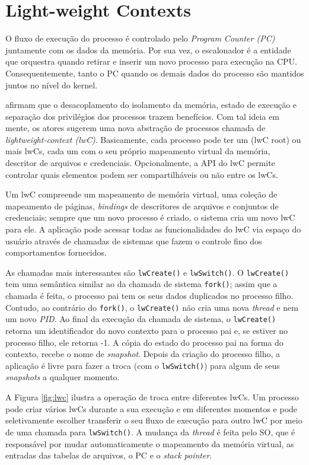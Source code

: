\section{Light-weight Contexts}
\label{sec:lwc}

O fluxo de execução do processo é controlado pelo \textit{Program Counter (PC)}
juntamente com os dados da memória. Por sua vez, o escalonador é a entidade que
orquestra quando retirar e inserir um novo processo para execução na CPU. Consequentemente,
tanto o PC quando os demais dados do processo são mantidos juntos no nível do
kernel.

\citet{litton} afirmam que o desacoplamento do isolamento da memória, estado de
execução e separação dos privilégios dos processos trazem benefícios. Com tal
ideia em mente, os atores sugerem uma nova abstração de processos chamada de
\textit{lightweight-context (lwC)}. Basicamente, cada processo pode ter um
(lwC root) ou mais lwCs, cada um com o seu próprio mapeamento
virtual da memória, descritor de arquivos e credenciais. Opcionalmente, a API
do lwC permite controlar quais elementos podem ser compartilháveis ou não entre
os lwCs.

Um lwC compreende um mapeamento de memória virtual, uma coleção de mapeamento
de páginas, \emph{bindings} de descritores de arquivos e conjuntos de
credenciais; sempre que um novo processo é criado, o sistema cria um novo lwC
para ele. A aplicação pode acessar todas as funcionalidades do lwC via espaço
do usuário através de chamadas de sistemas que fazem o controle fino dos
comportamentos fornecidos.

As chamadas mais interessantes são \texttt{lwCreate()} e \texttt{lwSwitch()}.
O \texttt{lwCreate()} tem uma semântica similar ao da chamada de sistema
\texttt{fork()}; assim que a chamada é feita, o processo pai tem os seus dados
duplicados no processo filho. Contudo, ao contrário do \texttt{fork()}, o
\texttt{lwCreate()} não cria uma nova \emph{thread} e nem um novo \emph{PID}.
Ao final da execução da chamada de sistema, o \texttt{lwCreate()} retorna um
identificador do novo contexto para o processo pai e, se estiver no processo
filho, ele retorna -1. A cópia do estado do processo pai na forma do contexto,
recebe o nome de \emph{snapshot}. Depois da criação do processo filho, a
aplicação é livre para fazer a troca (com o \texttt{lwSwitch()}) para algum de
seus \emph{snapshots} a qualquer momento.

A Figura \ref{fig:lwc} ilustra a operação de troca entre diferentes lwCs. Um
processo pode criar vários lwCs durante a sua execução e em
diferentes momentos e pode
seletivamente escolher transferir o seu fluxo de execução para outro lwC por
meio de uma chamada para \texttt{lwSwitch()}. A mudança da \emph{thread} é
feita pelo SO, que é responsável por mudar automaticamente o mapeamento da
memória virtual, as entradas das tabelas de arquivos, o PC e o \emph{stack
pointer}.

